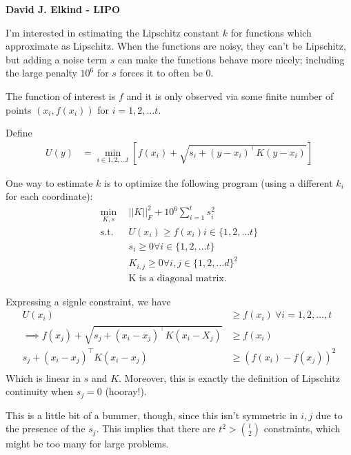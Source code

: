 \documentclass[11pt]{article}
\begin{document}
\begin{center}
  \textbf{David J. Elkind - LIPO} \\
\end{center}

I'm interested in estimating the Lipschitz constant $k$ for functions which approximate as Lipschitz. When the functions are noisy, they can't be Lipschitz, but adding a noise term $s$ can make the functions behave more nicely; including the large penalty $10^6$ for $s$ forces it to often be 0.

The function of interest is $f$ and it is only observed via some finite number of points $(x_i, f(x_i))$ for $i = 1,2,\dots t$.

Define
\begin{align}
U(y) &= \min_{i \in 1,2,\dots t} \left[ f(x_i) + \sqrt{s_i + (y - x_i)^\top K (y - x_i)} \right]
\end{align}

One way to estimate $k$ is to optimize the following program (using a different $k_i$ for each coordinate):
\begin{align}
  \min_{K, s}~~& ||K||_F^2 + 10^6 \sum_{i=1}^t s_i^2 \\
  \text{s.t.}~~& U(x_i) \ge f(x_i) i \in \{1,2, \dots t\} \\
  & s_i \ge 0 \forall i \in \{1,2, \dots t\} \\
  & K_{i,j} \ge 0 \forall i,j \in \{1, 2, \dots d\}^2 \\
  & \text{K is a diagonal matrix.} 
\end{align}

Expressing a signle constraint, we have 
\begin{align}
U(x_i) &\ge f(x_i) ~\forall i = 1, 2, \dots, t \\
\implies
f(x_j) + \sqrt{s_j + (x_i - x_j)^\top K (x_i - X_j)} &\ge f(x_i) \\
s_j + (x_i - x_j)^\top K (x_i - x_j) &\ge \left(f(x_i) - f(x_j)\right)^2\\
\end{align}
Which is linear in $s$ and $K$. Moreover, this is exactly the definition of Lipschitz continuity when $s_j =0 $ (hooray!).

This is a little bit of a bummer, though, since this isn't symmetric in $i,j$ due to the presence of the $s_j$. This implies that there are $t^2 > \binom{t}{2}$ constraints, which might be too many for large problems.
\end{document}
